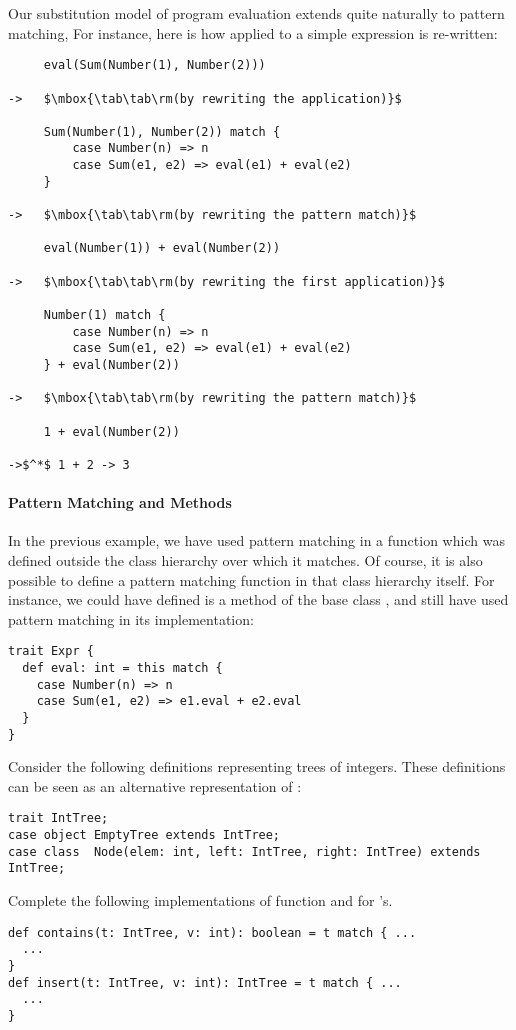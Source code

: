 \example Our substitution model of program evaluation extends quite naturally to pattern matching, For instance, here is how  applied to a simple expression is re-written:
\begin{lstlisting}
     eval(Sum(Number(1), Number(2)))

->   $\mbox{\tab\tab\rm(by rewriting the application)}$

     Sum(Number(1), Number(2)) match {
         case Number(n) => n
         case Sum(e1, e2) => eval(e1) + eval(e2)
     }

->   $\mbox{\tab\tab\rm(by rewriting the pattern match)}$

     eval(Number(1)) + eval(Number(2))

->   $\mbox{\tab\tab\rm(by rewriting the first application)}$

     Number(1) match {
         case Number(n) => n
         case Sum(e1, e2) => eval(e1) + eval(e2)
     } + eval(Number(2))

->   $\mbox{\tab\tab\rm(by rewriting the pattern match)}$

     1 + eval(Number(2))

->$^*$ 1 + 2 -> 3
\end{lstlisting}

\paragraph{Pattern Matching and Methods}
In the previous example, we have used pattern
matching in a function which was defined outside the class hierarchy
over which it matches.  Of course, it is also possible to define a
pattern matching function in that class hierarchy itself. For
instance, we could have defined
 is a method of the base class , and still have used pattern matching in its implementation:
\begin{lstlisting}
trait Expr { 
  def eval: int = this match { 
    case Number(n) => n
    case Sum(e1, e2) => e1.eval + e2.eval 
  } 
}
\end{lstlisting}

\begin{exercise} Consider the following definitions representing trees
of integers.  These definitions can be seen as an alternative
representation of :
\begin{lstlisting}
trait IntTree;
case object EmptyTree extends IntTree;
case class  Node(elem: int, left: IntTree, right: IntTree) extends IntTree;
\end{lstlisting}
Complete the following implementations of function  and  for 
's.
\begin{lstlisting} 
def contains(t: IntTree, v: int): boolean = t match { ... 
  ...
}
def insert(t: IntTree, v: int): IntTree = t match { ... 
  ...
}
\end{lstlisting}
\end{exercise}

